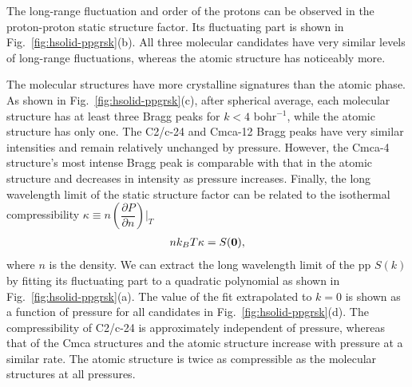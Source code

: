 The long-range fluctuation and order of the protons can be observed in the proton-proton static structure factor. Its fluctuating part is shown in Fig.~\ref{fig:hsolid-ppgrsk}(b).
All three molecular candidates have very similar levels of long-range fluctuations, whereas the atomic structure has noticeably more.

The molecular structures have more crystalline signatures than the atomic phase.
As shown in Fig.~\ref{fig:hsolid-ppgrsk}(c), after spherical average, each molecular structure has at least three Bragg peaks for $k<4$ bohr$^{-1}$, while the atomic structure has only one.
The C2/c-24 and Cmca-12 Bragg peaks have very similar intensities and remain relatively unchanged by pressure.
However, the Cmca-4 structure's most intense Bragg peak is comparable with that in the atomic structure and decreases in intensity as pressure increases.
Finally, the long wavelength limit of the static structure factor can be related to the isothermal compressibility $\kappa\equiv n(\dfrac{\partial P}{\partial n})\vert_T$
\begin{align}
nk_BT\kappa = S(\boldsymbol{0}),
\end{align}
where $n$ is the density. We can extract the long wavelength limit of the pp $S(k)$ by fitting its fluctuating part to a quadratic polynomial as shown in Fig.~\ref{fig:hsolid-ppgrsk}(a).
The value of the fit extrapolated to $k=0$ is shown as a function of pressure for all candidates in Fig.~\ref{fig:hsolid-ppgrsk}(d).
The compressibility of C2/c-24 is approximately independent of pressure, whereas that of the Cmca structures and the atomic structure increase with pressure at a similar rate.
The atomic structure is twice as compressible as the molecular structures at all pressures.


